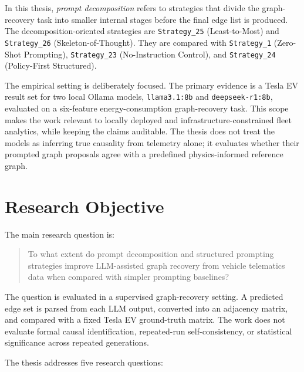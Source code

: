In this thesis, \emph{prompt decomposition} refers to strategies that divide
the graph-recovery task into smaller internal stages before the final edge
list is produced. The decomposition-oriented strategies are
\texttt{Strategy\_25} (Least-to-Most) and \texttt{Strategy\_26}
(Skeleton-of-Thought). They are compared with \texttt{Strategy\_1}
(Zero-Shot Prompting), \texttt{Strategy\_23} (No-Instruction Control), and
\texttt{Strategy\_24} (Policy-First Structured).

The empirical setting is deliberately focused. The primary evidence is a Tesla
EV result set for two local Ollama models, \texttt{llama3.1:8b} and
\texttt{deepseek-r1:8b}, evaluated on a six-feature energy-consumption
graph-recovery task. This scope makes the work relevant to locally deployed
and infrastructure-constrained fleet analytics, while keeping the claims
auditable. The thesis does not treat the models as inferring true causality
from telemetry alone; it evaluates whether their prompted graph proposals agree
with a predefined physics-informed reference graph.

\section{Research Objective}

The main research question is:

\begin{quote}
To what extent do prompt decomposition and structured prompting strategies
improve LLM-assisted graph recovery from vehicle telematics data when compared
with simpler prompting baselines?
\end{quote}

The question is evaluated in a supervised graph-recovery setting. A predicted
edge set is parsed from each LLM output, converted into an adjacency matrix,
and compared with a fixed Tesla EV ground-truth matrix. The work does not
evaluate formal causal identification, repeated-run self-consistency, or
statistical significance across repeated generations.

The thesis addresses five research questions:

